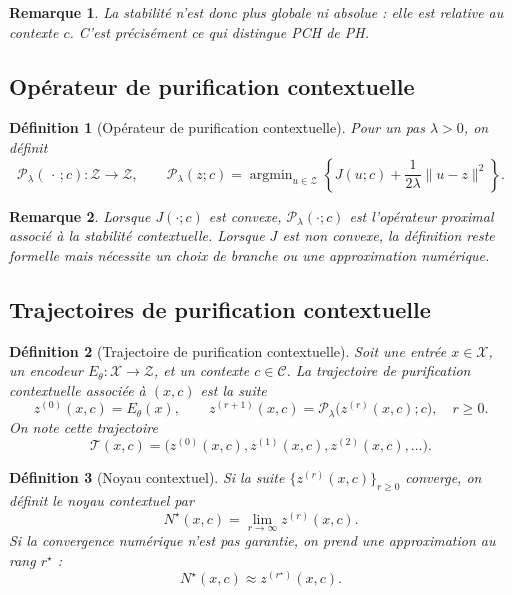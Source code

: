 \documentclass[11pt,a4paper]{article}
\newtheorem{definition}{Définition}[section]
\newtheorem{remark}{Remarque}[section]
\DeclareMathOperator{\argmin}{argmin}
\newcommand{\X}{\mathcal X}
\newcommand{\C}{\mathcal C}
\newcommand{\Z}{\mathcal Z}
\newcommand{\T}{\mathcal T}
\newcommand{\Pcal}{\mathcal P}
\newcommand{\1}{\mathbf 1}
\begin{document}
\begin{remark}
La stabilité n'est donc plus globale ni absolue : elle est relative au contexte \(c\).
C'est précisément ce qui distingue PCH de PH.
\end{remark}

\subsection{Opérateur de purification contextuelle}

\begin{definition}[Opérateur de purification contextuelle]
Pour un pas \(\lambda>0\), on définit
\[
\Pcal_{\lambda}(\,\cdot\,;c):\Z\to\Z,
\qquad
\Pcal_{\lambda}(z;c)
=
\argmin_{u\in\Z}
\left\{
J(u;c)
+
\frac{1}{2\lambda}\|u-z\|^2
\right\}.
\]
\end{definition}

\begin{remark}
Lorsque \(J(\cdot;c)\) est convexe, \(\Pcal_{\lambda}(\cdot;c)\) est l'opérateur proximal associé à la stabilité contextuelle.
Lorsque \(J\) est non convexe, la définition reste formelle mais nécessite un choix de branche ou une approximation numérique.
\end{remark}

\subsection{Trajectoires de purification contextuelle}

\begin{definition}[Trajectoire de purification contextuelle]
Soit une entrée \(x\in\X\), un encodeur \(E_\theta:\X\to\Z\), et un contexte \(c\in\C\).
La trajectoire de purification contextuelle associée à \((x,c)\) est la suite
\[
z^{(0)}(x,c)=E_\theta(x),
\qquad
z^{(r+1)}(x,c)=\Pcal_{\lambda}\!\bigl(z^{(r)}(x,c);c\bigr),
\quad r\ge 0.
\]
On note cette trajectoire
\[
\T(x,c)=\bigl(z^{(0)}(x,c),z^{(1)}(x,c),z^{(2)}(x,c),\dots\bigr).
\]
\end{definition}

\begin{definition}[Noyau contextuel]
Si la suite \(\{z^{(r)}(x,c)\}_{r\ge 0}\) converge, on définit le noyau contextuel par
\[
N^\star(x,c)=\lim_{r\to\infty}z^{(r)}(x,c).
\]
Si la convergence numérique n'est pas garantie, on prend une approximation au rang \(r^\star\) :
\[
N^\star(x,c)\approx z^{(r^\star)}(x,c).
\]
\end{definition}
\end{document}
